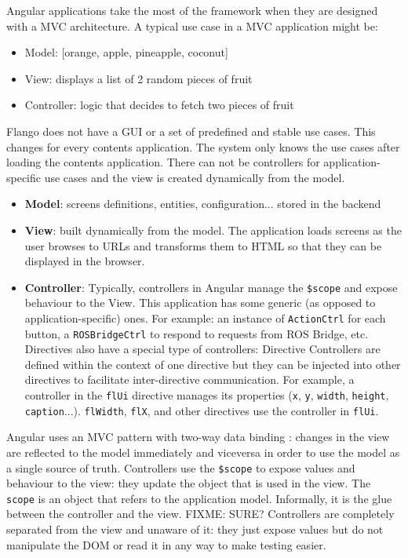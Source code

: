Angular applications take the most of the framework when they are designed with a \ac{MVC} architecture.
A typical use case in a \ac{MVC} application might be:
\begin{itemize}
    \item Model: [orange, apple, pineapple, coconut]
    \item View: displays a list of 2 random pieces of fruit
    \item Controller: logic that decides to fetch two pieces of fruit
\end{itemize}

Flango \cm does not have a \ac{GUI} or a set of predefined and stable use cases.
This changes for every contents application.
The system only knows the use cases after loading the contents application.
There can not be controllers for application-specific use cases and the view is created dynamically from the model.

\begin{itemize}
    \item \textbf{Model}: screens definitions, entities, configuration... stored in the backend
    \item \textbf{View}: built dynamically from the model. The application loads screens as the user browses to \ac{URL}s and transforms them to \ac{HTML} so that they can be displayed in the browser.
    \item \textbf{Controller}: Typically, controllers in Angular manage the \texttt{\$scope} and expose behaviour to the View. This application has some generic (as opposed to application-specific) ones. For example: an instance of \texttt{ActionCtrl} for each button, a \texttt{ROSBridgeCtrl} to respond to requests from ROS Bridge, etc. Directives also have a special type of controllers: Directive Controllers are defined within the context of one directive but they can be injected into other directives to facilitate inter-directive communication. For example, a controller in the \texttt{flUi} directive manages its properties (\texttt{x}, \texttt{y}, \texttt{width}, \texttt{height}, \texttt{caption}...). \texttt{flWidth}, \texttt{flX}, and other directives use the controller in \texttt{flUi}.
\end{itemize}

Angular uses an \ac{MVC} pattern with two-way data binding : changes in the view are reflected to the model immediately and viceversa in order to use the model as a single source of truth.
Controllers use the \texttt{\$scope} to expose values and behaviour to the view: they update the object that is used in the view.
The \texttt{scope} is an object that refers to the application model.
Informally, it is the glue between the controller and the view.
FIXME: SURE? Controllers are completely separated from the view and unaware of it: they just expose values but do not manipulate the \ac{DOM} or read it in any way to make testing easier.

